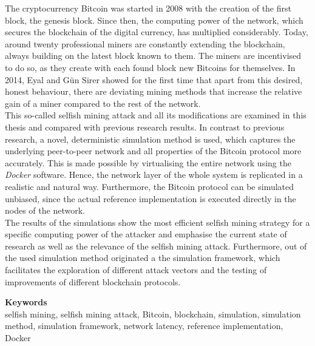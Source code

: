 The cryptocurrency Bitcoin was started in 2008 with the creation of the first block, the genesis block.
Since then, the computing power of the network, which secures the blockchain of the digital currency, has multiplied considerably.
Today, around twenty professional miners are constantly extending the blockchain, always building on the latest block known to them.
The miners are incentivised to do so, as they create with each found block new Bitcoins for themselves.
In 2014, Eyal and Gün Sirer showed for the first time that apart from this desired, honest behaviour, there are deviating mining methods that increase the relative gain of a miner compared to the rest of the network.\\
This so-called selfish mining attack and all its modifications are examined in this thesis and compared with previous research results.
In contrast to previous research, a novel, deterministic simulation method is used, which captures the underlying peer-to-peer network and all properties of the Bitcoin protocol more accurately.
This is made possible by virtualising the entire network using the \textit{Docker} software.
Hence, the network layer of the whole system is replicated in a realistic and natural way.
Furthermore, the Bitcoin protocol can be simulated unbiased, since the actual reference implementation is executed directly in the nodes of the network.\\
The results of the simulations show the most efficient selfish mining strategy for a specific computing power of the attacker and emphasise the current state of research as well as the relevance of the selfish mining attack.
Furthermore, out of the used simulation method originated a the simulation framework, which facilitates the exploration of different attack vectors and the testing of improvements of different blockchain protocols.

\bigskip
\noindent \textbf{Keywords}\\
selfish mining, selfish mining attack, Bitcoin, blockchain, simulation, simulation method, simulation framework, network latency, reference implementation, Docker